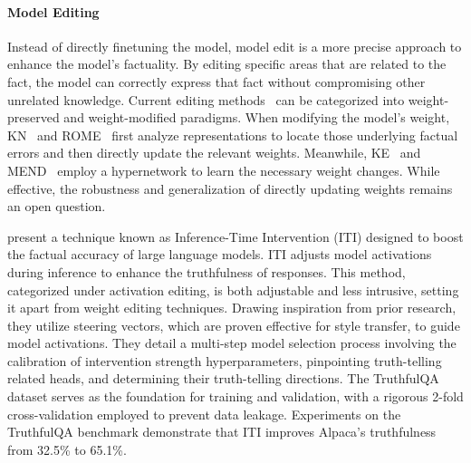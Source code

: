 \paragraph{\textbf{Model Editing}}
Instead of directly finetuning the model, model edit is a more precise approach to enhance the model's factuality. By editing specific areas that are related to the fact, the model can correctly express that fact without compromising other unrelated knowledge. Current editing methods~\citep{yao2023editing} can be categorized into weight-preserved and weight-modified paradigms. 
When modifying the model's weight, KN~\citep{dai-etal-2022-knowledge} and ROME~\citep{meng2022locating} first analyze representations to locate those underlying factual errors and then directly update the relevant weights. Meanwhile, KE~\citep{de-cao-etal-2021-editing} and MEND~\citep{mitchell2022fast} employ a hypernetwork to learn the necessary weight changes. While effective, the robustness and generalization of directly updating weights remains an open question.

\citet{li2023inferencetime} present a technique known as Inference-Time Intervention (ITI) designed to boost the factual accuracy of large language models.  ITI adjusts model activations during inference to enhance the truthfulness of responses. This method, categorized under activation editing, is both adjustable and less intrusive, setting it apart from weight editing techniques. Drawing inspiration from prior research, they utilize steering vectors, which are proven effective for style transfer, to guide model activations. They detail a multi-step model selection process involving the calibration of intervention strength hyperparameters, pinpointing truth-telling related heads, and determining their truth-telling directions. The TruthfulQA dataset serves as the foundation for training and validation, with a rigorous 2-fold cross-validation employed to prevent data leakage. Experiments on the TruthfulQA benchmark demonstrate that ITI improves Alpaca's \citep{alpaca} truthfulness from 32.5\% to 65.1\%.




